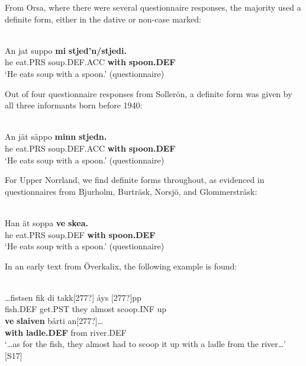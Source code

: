 \z

From Orsa, where there were several questionnaire responses, the majority used a definite form, either in the dative or non-case marked:


\ea \label{} 
\\
\gll An  jat  suppo  \textbf{mi} \textbf{  stjed’n/stjedi.}\\
he  eat.PRS  soup.DEF.ACC  \textbf{with} \textbf{spoon.DEF}\\
\glt ‘He eats soup with a spoon.’ (questionnaire)

\z

Out of four questionnaire responses from Sollerön, a definite form was given by all three informants born before 1940:


\ea \label{} 
\\
\gll An  jät  såppo  \textbf{minn} \textbf{  stjedn.} \\
he  eat.PRS  soup.DEF.ACC  \textbf{with} \textbf{spoon.DEF} \\
\glt ‘He eats soup with a spoon.’ (questionnaire)

\z

For Upper Norrland, we find definite forms throughout, as evidenced in questionnaires from Bjurholm, Burträsk, Norsjö, and Glommersträsk:

\ea \label{} 
\\
\gll Han  ät  soppa  \textbf{ve} \textbf{skea.} \\
he  eat.PRS  soup.DEF  \textbf{with} \textbf{spoon.DEF} \\
\glt ‘He eats soup with a spoon.’ (questionnaire)

\z

In an early text from Överkalix, the following example is found:

\ea \label{} 
\\
\gll …fistsen  fik  di  takk[277?]  åys  [277?]pp\\
fish.DEF  get.PST  they  almost  scoop.INF  up\\
\gll \textbf{ve} \textbf{slaiven} bårti  an[277?]…\\
\textbf{with} \textbf{ladle.DEF} from  river.DEF\\
\glt ‘…as for the fish, they almost had to scoop it up with a ladle from the river…’ [S17]

